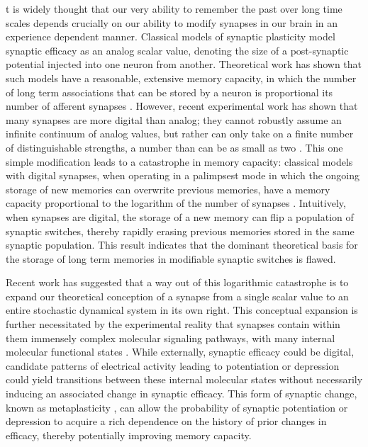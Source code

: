 t is widely thought that our very ability to remember the past over long time scales depends crucially on our ability to modify synapses in our brain in an experience dependent manner.
Classical models of synaptic plasticity model synaptic efficacy as an analog scalar value, denoting the size of a post-synaptic potential injected into one neuron from another.
Theoretical work has shown that such models have a reasonable, extensive memory capacity, in which the number of long term associations that can be stored by a neuron is proportional its number of afferent synapses \cite{Hopfield1982model,Amit1985hopfield,Gardner1988perceptron}.
However, recent experimental work has shown that many synapses are more digital than analog; they cannot robustly assume an infinite continuum of analog values, but rather can only take on a finite number of distinguishable strengths, a number than can be as small as two \cite{Bliss1993LTP,Petersen1998allornone,O'Connor2005switch} \cite[though see][] {Enoki2009graded}.
This one simple modification leads to a catastrophe in memory capacity:  classical models with digital synapses, when operating in a palimpsest mode in which the ongoing storage of new memories can overwrite previous memories, have a memory capacity proportional to the logarithm of the number of synapses \cite{amit1992constraints,amit1994learning}.
Intuitively, when synapses are digital, the storage of a new memory can flip a population of synaptic switches, thereby rapidly erasing previous memories stored in the same synaptic population. This result indicates that the dominant theoretical basis for the storage of long term memories in modifiable synaptic switches is flawed.

Recent work \cite{Fusi2005cascade,Fusi2007multistate,Leibold2008serial} has suggested that a way out of this logarithmic catastrophe is to expand our theoretical conception of a synapse from a single scalar value to an entire stochastic dynamical system in its own right.
This conceptual expansion is further necessitated by the experimental reality that synapses contain within them immensely complex molecular signaling pathways, with many internal molecular functional states \cite[\eg see][]{Bliss1993LTP,Bredt2003AMPA,Coba2009phosphorylation}.
While externally, synaptic efficacy could be digital, candidate patterns of electrical activity leading to potentiation or depression could yield transitions between these internal molecular states without necessarily inducing an associated change in synaptic efficacy.
This form of synaptic change, known as metaplasticity \cite{Abraham1996metaplasticity,Montgomery2002765}, can allow the probability of synaptic potentiation or depression to acquire a rich dependence on the history of prior changes in efficacy, thereby potentially improving memory capacity.

